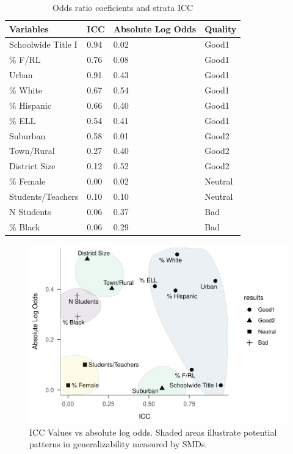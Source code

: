 \documentclass[man,floatsintext]{apa6}
\begin{document}
\begin{table}[tbp]
\begin{center}
\begin{threeparttable}
\caption{\label{tab:tab-ICC-Pars}Odds ratio coeficients and strata ICC}
\begin{tabular}{llll}
\toprule
Variables & ICC & Absolute Log Odds & Quality\\
\midrule
Schoolwide Title I & 0.94 & 0.02 & Good1\\
\% F/RL & 0.76 & 0.08 & Good1\\
Urban & 0.91 & 0.43 & Good1\\
\% White & 0.67 & 0.54 & Good1\\
\% Hispanic & 0.66 & 0.40 & Good1\\
\% ELL & 0.54 & 0.41 & Good1\\
Suburban & 0.58 & 0.01 & Good2\\
Town/Rural & 0.27 & 0.40 & Good2\\
District Size & 0.12 & 0.52 & Good2\\
\% Female & 0.00 & 0.02 & Neutral\\
Students/Teachers & 0.10 & 0.10 & Neutral\\
N Students & 0.06 & 0.37 & Bad\\
\% Black & 0.06 & 0.29 & Bad\\
\bottomrule
\end{tabular}
\end{threeparttable}
\end{center}
\end{table}



\begin{figure}
\centering
\includegraphics{GenSamp-Paper_files/figure-latex/fig-ICCvsCoef-1.pdf}
\caption{\label{fig:fig-ICCvsCoef}ICC Values vs absolute log odds. Shaded areas illustrate potential patterns in generalizability measured by SMDs.}
\end{figure}
\end{document}

